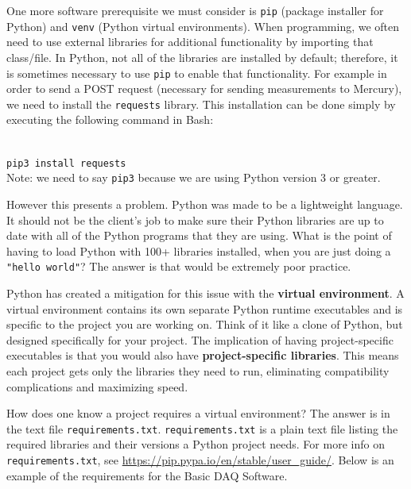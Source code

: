 \documentclass[12pt, letterpaper]{article}
\begin{document}
\par One more software prerequisite we must consider is \texttt{pip} (package installer for Python) and \texttt{venv} (Python virtual environments). When programming, we often need to use external libraries for additional functionality by importing that class/file. In Python, not all of the libraries are installed by default; therefore, it is sometimes necessary to use \texttt{pip} to enable that functionality. For example in order to send a POST request (necessary for sending measurements to Mercury), we need to install the \texttt{requests} library. This installation can be done simply by executing the following command in Bash: \\[1\baselineskip]\

\texttt{pip3 install requests} \\[1\baselineskip]

\noindent Note: we need to say \texttt{pip3} because we are using Python version 3 or greater. \\

\par However this presents a problem. Python was made to be a lightweight language. It should not be the client's job to make sure their Python libraries are up to date with all of the Python programs that they are using. What is the point of having to load Python with 100+ libraries installed, when you are just doing a \texttt{"hello world"}? The answer is that would be extremely poor practice. 

\par Python has created a mitigation for this issue with the \textbf{virtual environment}. A virtual environment contains its own separate Python runtime executables and is specific to the project you are working on. Think of it like a clone of Python, but designed specifically for your project. The implication of having project-specific executables is that you would also have \textbf{project-specific libraries}. This means each project gets only the libraries they need to run, eliminating compatibility complications and maximizing speed. 

\par How does one know a project requires a virtual environment? The answer is in the text file \texttt{requirements.txt}. \texttt{requirements.txt} is a plain text file listing the required libraries and their versions a Python project needs. For more info on \texttt{requirements.txt}, see \url{https://pip.pypa.io/en/stable/user_guide/}. Below is an example of the requirements for the Basic DAQ Software. 
\end{document}

